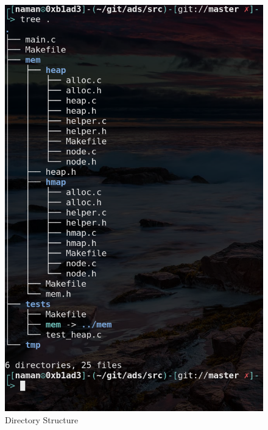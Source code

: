 \documentclass[conference,a4paper,12pt]{IEEEtran}
\begin{document}
	\begin{figure}[h]
	  \includegraphics[width=\linewidth]{structure.png}
	  \caption{Directory Structure}
	  \label{Directory Structure}
	\end{figure}
\end{document}
